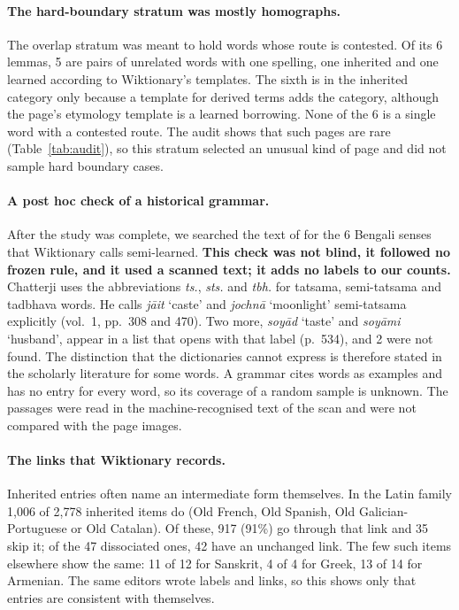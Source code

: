 \documentclass[11pt]{article}
\newcommand{\gl}[1]{`#1'}
\begin{document}
\paragraph{The hard-boundary stratum was mostly homographs.} The overlap stratum was meant to hold words whose route is contested. Of its 6 lemmas, 5 are pairs of unrelated words with one spelling, one inherited and one learned according to Wiktionary's templates. The sixth is in the inherited category only because a template for derived terms adds the category, although the page's etymology template is a learned borrowing. None of the 6 is a single word with a contested route. The audit shows that such pages are rare (Table~\ref{tab:audit}), so this stratum selected an unusual kind of page and did not sample hard boundary cases.

\paragraph{A post hoc check of a historical grammar.} After the study was complete, we searched the text of \citet{chatterji1926} for the 6 Bengali senses that Wiktionary calls semi-learned. \textbf{This check was not blind, it followed no frozen rule, and it used a scanned text; it adds no labels to our counts.} Chatterji uses the abbreviations \textit{ts.}, \textit{sts.} and \textit{tbh.} for tatsama, semi-tatsama and tadbhava words. He calls \textit{j\=ait} \gl{caste} and \textit{jochn\=a} \gl{moonlight} semi-tatsama explicitly (vol.~1, pp.~308 and 470). Two more, \textit{soy\=ad} \gl{taste} and \textit{soy\=ami} \gl{husband}, appear in a list that opens with that label (p.~534), and 2 were not found. The distinction that the dictionaries cannot express is therefore stated in the scholarly literature for some words. A grammar cites words as examples and has no entry for every word, so its coverage of a random sample is unknown. The passages were read in the machine-recognised text of the scan and were not compared with the page images.

\paragraph{The links that Wiktionary records.} Inherited entries often name an intermediate form themselves. In the Latin family 1,006 of 2,778 inherited items do (Old French, Old Spanish, Old Galician-Portuguese or Old Catalan). Of these, 917 (91\%) go through that link and 35 skip it; of the 47 dissociated ones, 42 have an unchanged link. The few such items elsewhere show the same: 11 of 12 for Sanskrit, 4 of 4 for Greek, 13 of 14 for Armenian. The same editors wrote labels and links, so this shows only that entries are consistent with themselves.
\end{document}
